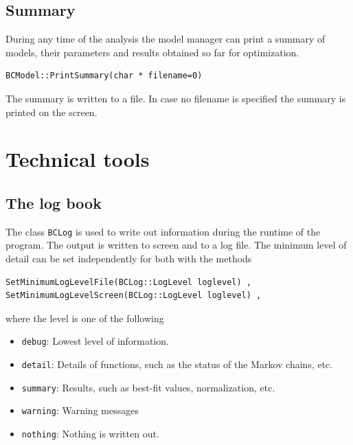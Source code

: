 \documentclass[11pt, a4paper]{article}
\begin{document}
\subsection{Summary} 

During any time of the analysis the model manager can print a summary
of models, their parameters and results obtained so far for
optimization. 
%
\begin{verbatim}
BCModel::PrintSummary(char * filename=0)
\end{verbatim} 

\noindent 
The summary is written to a file. In case no filename is specified the
summary is printed on the screen. 



\section{Technical tools} 
\label{section:tools} 


\subsection{The log book} 

The class \verb|BCLog| is used to write out information during the
runtime of the program. The output is written to screen and to a log
file. The minimum level of detail can be set independently for both 
with the methods 
%
\begin{verbatim} 
SetMinimumLogLevelFile(BCLog::LogLevel loglevel) , 
SetMinimumLogLevelScreen(BCLog::LogLevel loglevel) , 
\end{verbatim} 

\noindent 
where the level is one of the following 
%
\begin{itemize} 
\item \verb|debug|: Lowest level of information. 
\item \verb|detail|: Details of functions, such as the status of the Markov chains, etc. 
\item \verb|summary|: Results, such as best-fit values, normalization, etc. 
\item \verb|warning|: Warning messages 
\item \verb|nothing|: Nothing is written out. 
\end{itemize} 
\end{document}
